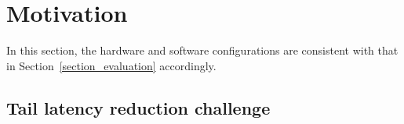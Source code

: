 \documentclass[pageno]{jpaper}
\begin{document}
 




\section{Motivation} \label{Section_Motivation}

In this section, the hardware and software configurations are consistent with that in Section~\ref{section_evaluation} accordingly.

























\subsection{Tail latency reduction challenge}\label{section_motivation_tail_latency}
\end{document}
